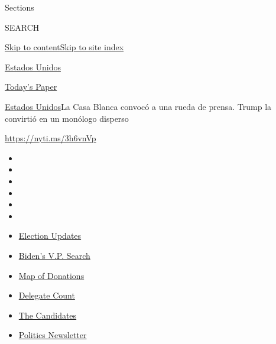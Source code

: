 Sections

SEARCH

\protect\hyperlink{site-content}{Skip to
content}\protect\hyperlink{site-index}{Skip to site index}

\href{https://www.nytimes.com/es/section/estados-unidos}{Estados Unidos}

\href{https://myaccount.nytimes.com/auth/login?response_type=cookie\&client_id=vi}{}

\href{https://www.nytimes.com/section/todayspaper}{Today's Paper}

\href{/es/section/estados-unidos}{Estados Unidos}\textbar{}La Casa
Blanca convocó a una rueda de prensa. Trump la convirtió en un monólogo
disperso

\url{https://nyti.ms/3h6vnVp}

\begin{itemize}
\item
\item
\item
\item
\item
\item
\end{itemize}

\begin{itemize}
\item
  \href{https://www.nytimes.com/2020/08/03/us/elections/biden-vs-trump.html?action=click\&pgtype=Article\&state=default\&region=TOP_BANNER\&context=storylines_menu}{Election
  Updates}
\item
  \href{https://www.nytimes.com/article/biden-vice-president-2020.html?action=click\&pgtype=Article\&state=default\&region=TOP_BANNER\&context=storylines_menu}{Biden's
  V.P. Search}
\item
  \href{https://www.nytimes.com/interactive/2020/07/24/us/politics/trump-biden-campaign-donors.html?action=click\&pgtype=Article\&state=default\&region=TOP_BANNER\&context=storylines_menu}{Map
  of Donations}
\item
  \href{https://www.nytimes.com/interactive/2020/us/elections/delegate-count-primary-results.html?action=click\&pgtype=Article\&state=default\&region=TOP_BANNER\&context=storylines_menu}{Delegate
  Count}
\item
  \href{https://www.nytimes.com/interactive/2019/us/politics/2020-presidential-candidates.html?action=click\&pgtype=Article\&state=default\&region=TOP_BANNER\&context=storylines_menu}{The
  Candidates}
\item
  \href{https://www.nytimes.com/newsletters/politics?action=click\&pgtype=Article\&state=default\&region=TOP_BANNER\&context=storylines_menu}{Politics
  Newsletter}
\end{itemize}

